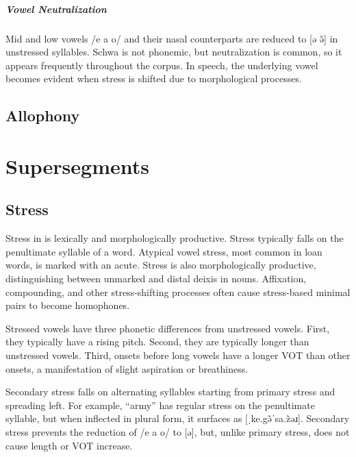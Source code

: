 \paragraph{Vowel Neutralization} 
Mid and low vowels /e a o/ and their nasal counterparts are reduced to [ə ə̃] in unstressed syllables.  Schwa is not phonemic, but neutralization is common, so it appears frequently throughout the corpus. In speech, the underlying vowel becomes evident when stress is shifted due to morphological processes.

\section{Allophony}

\setchapterpreamble[u]{\margintoc}
\chapter{Supersegments}
\section{Stress}
Stress in \langname{} is lexically and morphologically productive. Stress typically falls on the penultimate syllable of a word. Atypical vowel stress, most common in loan words, is marked with an acute.  Stress is also morphologically productive, distinguishing between unmarked and distal deixis in nouns. Affixation, compounding, and other stress-shifting processes often cause stress-based minimal pairs to become homophones.

Stressed vowels have three phonetic differences from unstressed vowels. First, they typically have a rising pitch. Second, they are typically longer than unstressed vowels. Third, onsets before long vowels have a longer VOT than other onsets, a manifestation of slight aspiration or breathiness.

Secondary stress falls on alternating syllables starting from primary stress and spreading left. For example,  “army” has regular stress on the penultimate syllable, but when inflected in plural form, it surfaces as  [ˌke.gə̃ˈsa.z̃əɹ]. Secondary stress prevents the reduction of /e a o/ to [ə], but, unlike primary stress, does not cause length or VOT increase.

